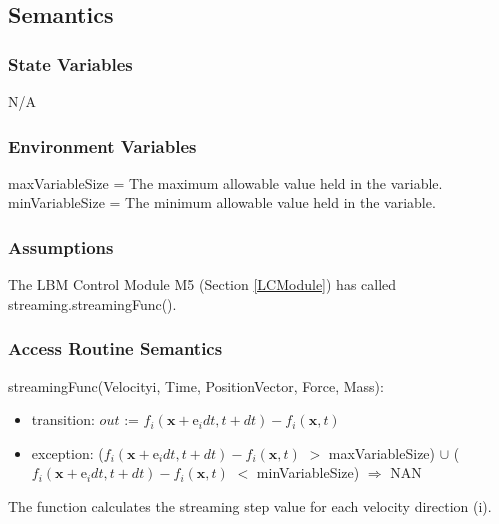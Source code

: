 \documentclass[12pt, titlepage]{article}
\begin{document}
\subsection{Semantics}

\subsubsection{State Variables}

N/A

\subsubsection{Environment Variables}
maxVariableSize = The maximum allowable value held in the variable.\\
minVariableSize = The minimum allowable value held in the variable.

\subsubsection{Assumptions}

The LBM Control Module M5 (Section \ref{LCModule}) has called streaming.streamingFunc().

\subsubsection{Access Routine Semantics}

\noindent streamingFunc(Velocityi, Time, PositionVector, Force, Mass):
\begin{itemize}
	\item transition: $out$ := $f_i(\mathrm{\textbf{x}} +\mathrm{e}_i dt, t + dt) - f_i(\mathrm{\textbf{x}},t)$
	\item exception: ($f_i(\mathrm{\textbf{x}} +\mathrm{e}_i dt, t + dt) - f_i(\mathrm{\textbf{x}},t)$ $>$ maxVariableSize) $\cup$ ($f_i(\mathrm{\textbf{x}} +\mathrm{e}_i dt, t + dt) - f_i(\mathrm{\textbf{x}},t)$ $<$ minVariableSize) $\Rightarrow$ NAN
\end{itemize}

The function calculates the streaming step value for each velocity direction (i).
\end{document}
